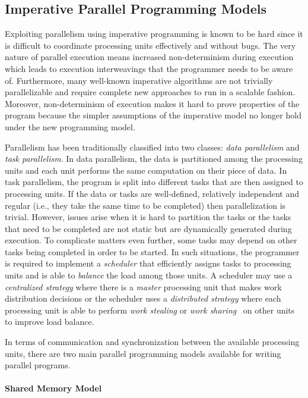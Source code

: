 \subsection{Imperative Parallel Programming Models}

Exploiting parallelism using imperative programming is known to be hard since it
is difficult to coordinate processing units effectively and without bugs. The
very nature of parallel execution means increased non-determinism during
execution which leads to execution interweavings that the programmer needs to be
aware of. Furthermore, many well-known imperative algorithms are not trivially
parallelizable and require complete new approaches to run in a scalable fashion.
Moreover, non-determinism of execution makes it hard to prove properties of the
program because the simpler assumptions of the imperative model no longer hold
under the new programming model.


Parallelism has been traditionally classified into two classes: \emph{data
parallelism} and \emph{task parallelism}. In data parallelism, the data is
partitioned among the processing units and each unit performs the same
computation on their piece of data. In task parallelism, the program is split
into different tasks that are then assigned to processing units. If the data or
tasks are well-defined, relatively independent and regular (i.e., they take the
same time to be completed) then parallelization is trivial. However, issues
arise when it is hard to partition the tasks or the tasks that need to be
completed are not static but are dynamically generated during execution. To
complicate matters even further, some tasks may depend on other tasks being
completed in order to be started. In such situations, the programmer is required
to implement a \emph{scheduler} that efficiently assigns tasks to processing
units and is able to \emph{balance} the load among those units. A scheduler may
use a \emph{centralized strategy} where there is a \emph{master} processing unit
that makes work distribution decisions or the scheduler uses a \emph{distributed
strategy} where each processing unit is able to perform \emph{work stealing} or
\emph{work sharing}~\cite{Blumofe:1999} on other units to improve load balance.

In terms of communication and synchronization between the available processing
units, there are two main parallel programming models available for writing
parallel programs.

\paragraph{Shared Memory Model}

